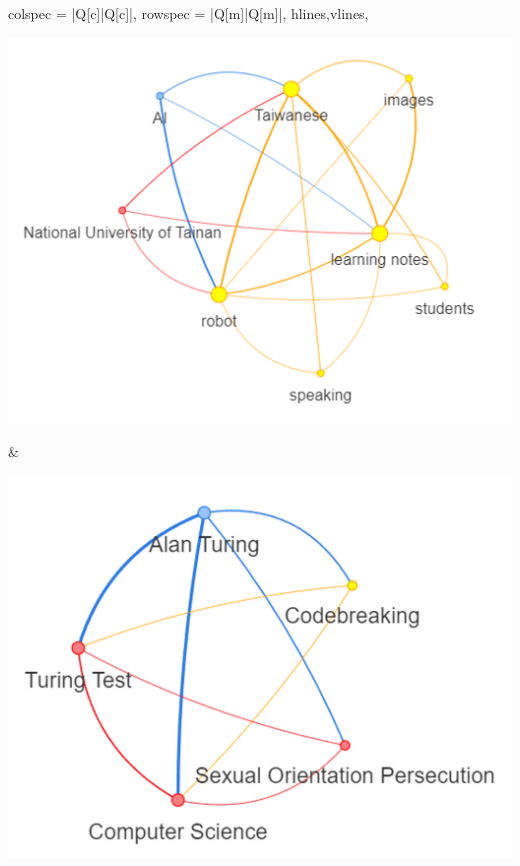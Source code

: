 \begin{longtblr}[
    caption = {臺南大學AI機器人場域驗證影片和艾倫圖靈的故事文本內容及知識圖},
]{
    colspec = {|Q[c]|Q[c]|},
    rowspec = {|Q[m]|Q[m]|},
    hlines,vlines,
}
\begin{minipage}[t][5cm][b]{0.3\textwidth}
            \includegraphics[width=\textwidth]{images/w2/w2_zephyr_1.png}\\
            \setcounter{figure}{2} 
            \captionsetup{font=scriptsize}
\end{minipage}  &  
\begin{minipage}[t][5cm][b]{0.3\textwidth}
            \centering
            \includegraphics[width=\textwidth]{images/w2/w2_zephyr_2.png}\\
            \setcounter{figure}{3} 
            \captionsetup{font=scriptsize}
        \end{minipage} \\

\end{longtblr}
